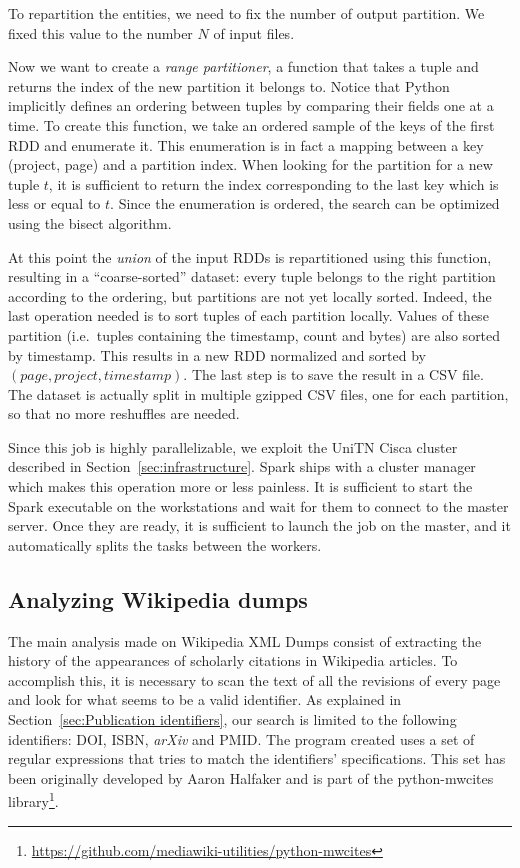 To repartition the entities, we need to fix the number of output partition.
We fixed this value to the number $N$ of input files.

Now we want to create a \emph{range partitioner}, a function that takes a tuple and returns the index of the new partition it belongs to.
Notice that Python implicitly defines an ordering between tuples by comparing their fields one at a time.
To create this function, we take an ordered sample of the keys of the first \ac{RDD} and enumerate it.
This enumeration is in fact a mapping between a key (project, page) and a partition index.
When looking for the partition for a new tuple $t$, it is sufficient to return the index corresponding to the last key which is less or equal to $t$.
Since the enumeration is ordered, the search can be optimized using the bisect algorithm.

At this point the \emph{union} of the input \acp{RDD} is repartitioned using this function, resulting in a ``coarse-sorted'' dataset: every tuple belongs to the right partition according to the ordering, but partitions are not yet locally sorted.
Indeed, the last operation needed is to sort tuples of each partition locally.
Values of these partition (i.e.\ tuples containing the timestamp, count and bytes) are also sorted by timestamp.
This results in a new \ac{RDD} normalized and sorted by $(page, project, timestamp)$.
The last step is to save the result in a CSV file.
The dataset is actually split in multiple gzipped CSV files, one for each partition, so that no more reshuffles are needed.

Since this job is highly parallelizable, we exploit the UniTN Cisca cluster described in Section~\ref{sec:infrastructure}.
Spark ships with a cluster manager which makes this operation more or less painless.
It is sufficient to start the Spark executable on the workstations and wait for them to connect to the master server.
Once they are ready, it is sufficient to launch the job on the master, and it automatically splits the tasks between the workers.

\subsection{Analyzing Wikipedia dumps}
\label{sub:Analyzing Wikipedia dumps}
The main analysis made on Wikipedia XML Dumps consist of extracting the history of the appearances of scholarly citations in Wikipedia articles.
To accomplish this, it is necessary to scan the text of all the revisions of every page and look for what seems to be a valid identifier.
As explained in Section~\ref{sec:Publication identifiers}, our search is limited to the following identifiers: \ac{DOI}, \ac{ISBN}, \emph{arXiv} and \ac{PMID}.
The program created uses a set of regular expressions that tries to match the identifiers' specifications.
This set has been originally developed by Aaron Halfaker and is part of the python-mwcites library\footnote{\url{https://github.com/mediawiki-utilities/python-mwcites}}.

